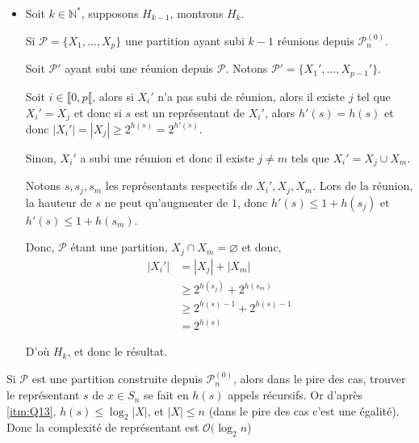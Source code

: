 \documentclass{article}
\newcommand{\bb}[1]{\mathbb{#1}}
\begin{document}
\begin{question}
\begin{itemize}
        \item Soit $k \in \bb{N}^*$, supposons $H_{k - 1}$, montrons $H_k$.
        
        Si $\mathscr{P} = \{X_1, \hdots, X_p\}$ une partition ayant subi $k-1$
        réunions depuis $\mathscr{P}^{(0)}_n$.

        Soit $\mathscr{P}'$ ayant subi une réunion depuis $\mathscr{P}$.
        Notons $\mathscr{P}' = \{X_1', \hdots, X_{p - 1}'\}$.

        \vspace{1em}

        Soit $i \in \llbracket 0, p \llbracket$, alors si $X_i'$ n'a pas subi
        de réunion, alors il existe $j$ tel que $X_i' = X_j$ et donc si $s$ est 
        un représentant de $X_i'$, alors $h'(s) = h(s)$ et donc $|X_i'| = |X_j|
        \geqslant 2^{h(s)} = 2^{h'(s)}$.

        \vspace{1em}

        Sinon, $X_i'$ a subi une réunion et donc il existe $j \neq m$ tels que
        $X_i' = X_j \cup X_m$.

        Notons $s, s_j, s_m$ les représentants respectifs de $X_i', X_j, X_m$.
        Lors de la réunion, la hauteur de $s$ ne peut qu'augmenter de $1$, donc
        $h'(s) \leqslant 1 + h(s_j)$ et $h'(s) \leqslant 1 + h(s_m)$.

        Donc, $\mathscr{P}$ étant une partition, $X_j \cap X_m = \varnothing$
        et donc, 
        \begin{align*}
            |X_i'| &= |X_j| + |X_m| \\
                   &\geqslant 2^{h(s_j)} + 2^{h(s_m)} \\
                   &\geqslant 2^{h(s) - 1} + 2^{h(s) - 1} \\
                   &= 2^{h(s)}
        \end{align*}

        D'où $H_k$, et donc le résultat.
    \end{itemize}

    \item Si $\mathscr{P}$ est une partition construite depuis 
    $\mathscr{P}^{(0)}_n$, alors dans le pire des cas, trouver le représentant
    $s$ de $x \in S_n$ se fait en $h(s)$ appels récursifs. Or d'après 
    \ref{itm:Q13}, $h(s) \leqslant \log_2 |X|$, et $|X| \leqslant n$ (dans le
    pire des cas c'est une égalité). Donc la complexité de représentant est
    $\mathcal{O}(\log_2 n$)


\end{question}
\end{document}
